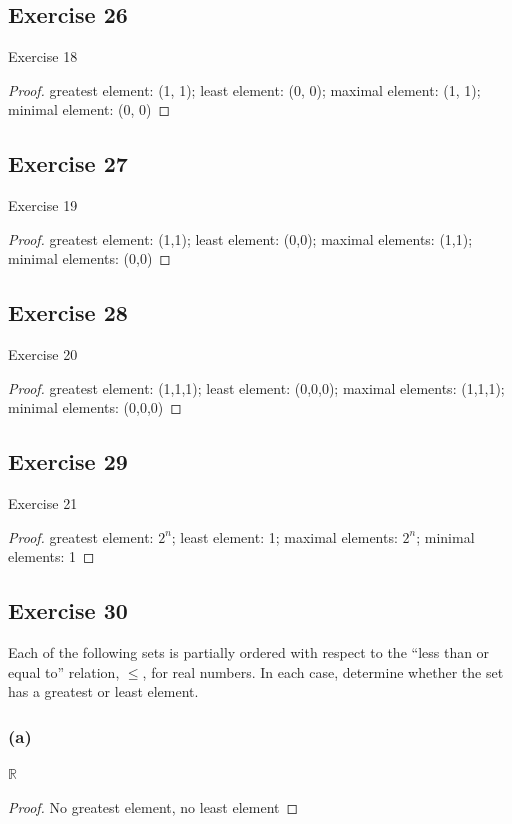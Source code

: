 \documentclass[14pt]{extarticle}
\newcommand{\R}{\mathbb{R}}
\begin{document}
\subsection{Exercise 26}
Exercise 18
\begin{proof}
        greatest element: (1, 1); least element: (0, 0); maximal element: (1, 1); minimal element: (0, 0)
\end{proof}

\subsection{Exercise 27}
Exercise 19
\begin{proof}
        greatest element: (1,1); least element: (0,0); maximal elements: (1,1); minimal elements: (0,0)
\end{proof}

\subsection{Exercise 28}
Exercise 20
\begin{proof}
        greatest element: (1,1,1); least element: (0,0,0); maximal elements: (1,1,1); minimal elements: (0,0,0)
\end{proof}

\subsection{Exercise 29}
Exercise 21
\begin{proof}
        greatest element: \(2^n\); least element: 1; maximal elements: \(2^n\); minimal elements: 1
\end{proof}

\subsection{Exercise 30}
Each of the following sets is partially ordered with respect to the “less than or equal to” relation, \(\leq\),
for real numbers. In each case, determine whether the set has a greatest or least element.

\subsubsection{(a)}
\(\R\)
\begin{proof}
        No greatest element, no least element

\end{proof}
\end{document}
